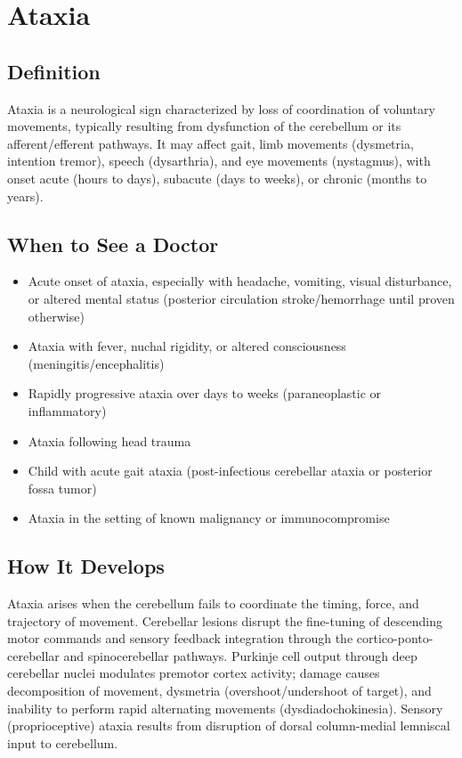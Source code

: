 \chapter{Ataxia}

\section*{Definition}
Ataxia is a neurological sign characterized by loss of coordination of voluntary movements, typically resulting from dysfunction of the cerebellum or its afferent/efferent pathways. It may affect gait, limb movements (dysmetria, intention tremor), speech (dysarthria), and eye movements (nystagmus), with onset acute (hours to days), subacute (days to weeks), or chronic (months to years).

\section*{When to See a Doctor}

\begin{itemize}
 \item Acute onset of ataxia, especially with headache, vomiting, visual disturbance, or altered mental status (posterior circulation stroke/hemorrhage until proven otherwise)
 \item Ataxia with fever, nuchal rigidity, or altered consciousness (meningitis/encephalitis)
 \item Rapidly progressive ataxia over days to weeks (paraneoplastic or inflammatory)
 \item Ataxia following head trauma
 \item Child with acute gait ataxia (post-infectious cerebellar ataxia or posterior fossa tumor)
 \item Ataxia in the setting of known malignancy or immunocompromise
\end{itemize}

\section*{How It Develops}
Ataxia arises when the cerebellum fails to coordinate the timing, force, and trajectory of movement. Cerebellar lesions disrupt the fine-tuning of descending motor commands and sensory feedback integration through the cortico-ponto-cerebellar and spinocerebellar pathways. Purkinje cell output through deep cerebellar nuclei modulates premotor cortex activity; damage causes decomposition of movement, dysmetria (overshoot/undershoot of target), and inability to perform rapid alternating movements (dysdiadochokinesia). Sensory (proprioceptive) ataxia results from disruption of dorsal column-medial lemniscal input to cerebellum.

